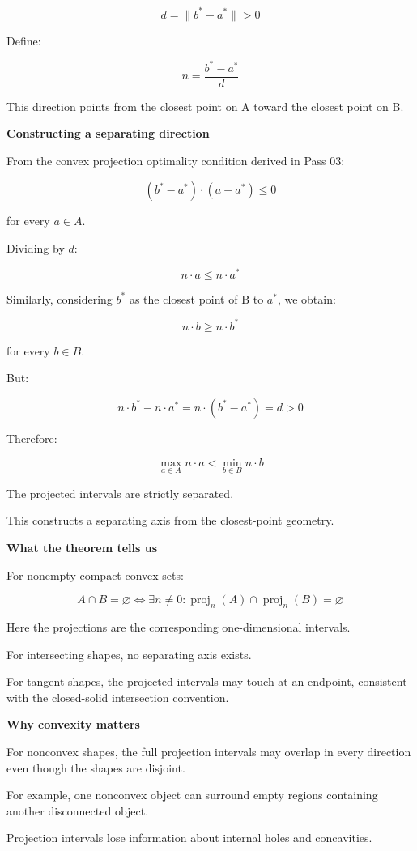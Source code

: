 \[
d=\|b^*-a^*\|>0
\]

Define:

\[
\boxed{ n=\frac{b^*-a^*}{d} }
\]

This direction points from the closest point on A toward the closest point on B.

\textbf{Constructing a separating direction}

From the convex projection optimality condition derived in Pass 03:

\[
(b^*-a^*)\cdot(a-a^*)\le0
\]

for every \(a\in A\).

Dividing by \(d\):

\[
n\cdot a\le n\cdot a^*
\]

Similarly, considering \(b^*\) as the closest point of B to \(a^*\), we obtain:

\[
n\cdot b\ge n\cdot b^*
\]

for every \(b\in B\).

But:

\[
n\cdot b^*-n\cdot a^* = n\cdot(b^*-a^*)=d>0
\]

Therefore:

\[
\boxed{ \max_{a\in A}n\cdot a < \min_{b\in B}n\cdot b }
\]

The projected intervals are strictly separated.

This constructs a separating axis from the closest-point geometry.

\textbf{What the theorem tells us}

For nonempty compact convex sets:

\[
\boxed{ A\cap B=\varnothing \iff \exists n\ne0: \operatorname{proj}_n(A) \cap \operatorname{proj}_n(B)=\varnothing }
\]

Here the projections are the corresponding one-dimensional intervals.

For intersecting shapes, no separating axis exists.

For tangent shapes, the projected intervals may touch at an endpoint, consistent with the closed-solid intersection convention.

\textbf{Why convexity matters}

For nonconvex shapes, the full projection intervals may overlap in every direction even though the shapes are disjoint.

For example, one nonconvex object can surround empty regions containing another disconnected object.

Projection intervals lose information about internal holes and concavities.

